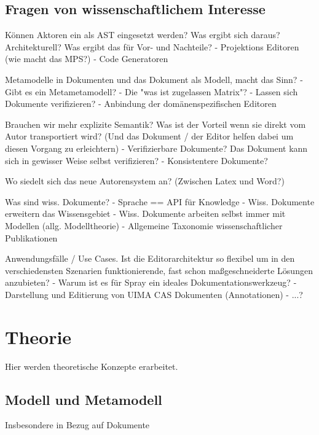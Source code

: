 

\section{Fragen von wissenschaftlichem Interesse}

Können Aktoren ein als AST eingesetzt werden?
Was ergibt sich daraus? Architekturell? Was ergibt das für Vor- und Nachteile?
  - Projektions Editoren (wie macht das MPS?)
  - Code Generatoren

Metamodelle in Dokumenten und das Dokument als Modell, macht das Sinn?
  - Gibt es ein Metametamodell?
  - Die "was ist zugelassen Matrix"?
  - Lassen sich Dokumente verifizieren?
  - Anbindung der domänenspezifischen Editoren

Brauchen wir mehr explizite Semantik? Was ist der Vorteil wenn sie direkt
vom Autor transportiert wird? (Und das Dokument / der Editor helfen dabei
um diesen Vorgang zu erleichtern)
  - Verifizierbare Dokumente? Das Dokument kann sich in gewisser Weise selbst verifizieren?
  - Konsistentere Dokumente?

Wo siedelt sich das neue Autorensystem an? (Zwischen Latex und Word?)

Was sind wiss. Dokumente?
  - Sprache == API für Knowledge
  - Wiss. Dokumente erweitern das Wissensgebiet
  - Wiss. Dokumente arbeiten selbst immer mit Modellen (allg. Modelltheorie)
  - Allgemeine Taxonomie wissenschaftlicher Publikationen

Anwendungsfälle / Use Cases. Ist die Editorarchitektur so flexibel um in den
verschiedensten Szenarien funktionierende, fast schon maßgeschneiderte Lösungen
anzubieten?
  - Warum ist es für Spray ein ideales Dokumentationswerkzeug?
  - Darstellung und Editierung von UIMA CAS Dokumenten (Annotationen)
  - ...?



\chapter{Theorie}

Hier werden theoretische Konzepte erarbeitet.

\section{Modell und Metamodell}

Insbesondere in Bezug auf Dokumente

